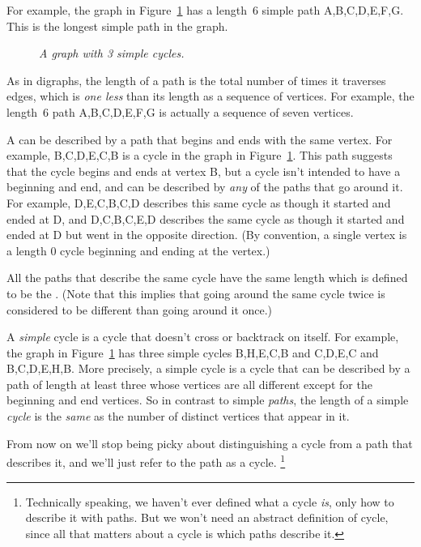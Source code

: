 For example, the graph in Figure~\ref{dg} has a length~6 simple path
A,B,C,D,E,F,G.  This is the longest simple path in the graph.
\begin{figure}
\caption{\em A graph with 3 simple cycles.}
\label{dg}
\end{figure}

As in digraphs, the length of a path is the total number of times it traverses edges,
which is \emph{one less} than its length as a sequence of vertices.  For example, the
length~6 path A,B,C,D,E,F,G is actually a sequence of seven vertices.

A \emph{} can be described by a path \iffalse of length two or
more\fi that begins and ends with the same vertex.  For example,
B,C,D,E,C,B is a cycle in the graph in Figure~\ref{dg}.  This path
suggests that the cycle begins and ends at vertex B, but a cycle isn't
intended to have a beginning and end, and can be described by \emph{any}
of the paths that go around it.  For example, D,E,C,B,C,D describes this
same cycle as though it started and ended at D, and D,C,B,C,E,D describes
the same cycle as though it started and ended at D but went in the
opposite direction.  (By convention, a single vertex is a length 0 cycle
beginning and ending at the vertex.)

All the paths that describe the same cycle have the same length which is defined to
be the .  (Note that this implies that going around the
same cycle twice is considered to be different than going around it once.)

A \emph{simple} cycle is a cycle that doesn't cross or
backtrack on itself.  For example, the graph in Figure~\ref{dg} has three
simple cycles B,H,E,C,B and C,D,E,C and B,C,D,E,H,B.  More precisely, a
simple cycle is a cycle that can be described by a path of length at least
three whose vertices are all different except for the beginning and end
vertices.  So in contrast to simple \emph{paths}, the length of a simple
\emph{cycle} is the \emph{same} as the number of distinct vertices that
appear in it.

From now on we'll stop being picky about distinguishing a cycle from a
path that describes it, and we'll just refer to the path as a cycle.
\footnote{Technically speaking, we haven't ever defined what a cycle
\emph{is}, only how to describe it with paths.  But we won't need an
abstract definition of cycle, since all that matters about a cycle is which
paths describe it.}

